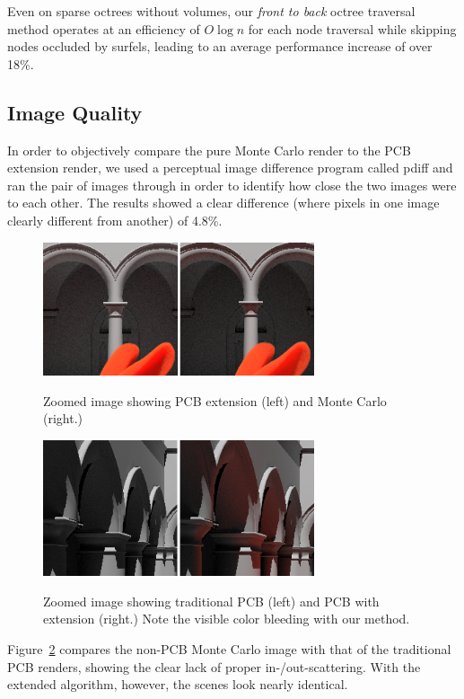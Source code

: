 \documentclass[12pt]{ucthesis}
\newcommand{\captionfonts}{\small\bf\ssp}
\begin{document}
Even on sparse octrees without volumes, our \textit{front to back} octree traversal method operates at an efficiency of $O\log{n}$ for each node traversal while skipping nodes occluded by surfels, leading to an average performance increase of over 18\%.

\subsection*{Image Quality}

In order to objectively compare the pure Monte Carlo render to the PCB extension render, we used a perceptual image difference program called pdiff and ran the pair of images through in order to identify how close the two images were to each other.  The results showed a clear difference (where pixels in one image clearly different from another) of 4.8\%.


\begin{figure}[h!]
    \centering
    \includegraphics[width=80mm]{img/compare1_corrected.png}
    \captionfonts
    \caption{Zoomed image showing PCB extension (left) and Monte Carlo (right.)}
    \label{fig:compare_close}
\end{figure}

\begin{figure}[h!]
    \centering
    \includegraphics[width=80mm]{img/compare_trad_corrected.png}
    \captionfonts
    \caption{Zoomed image showing traditional PCB (left) and PCB with extension (right.)  Note the visible color bleeding with our method.}
    \label{fig:compare_trad}
\end{figure}

Figure~\ref{fig:compare_trad} compares the non-PCB Monte Carlo image with that of the traditional PCB renders, showing the clear lack of proper in-/out-scattering.  With the extended algorithm, however, the scenes look nearly identical.
\end{document}

